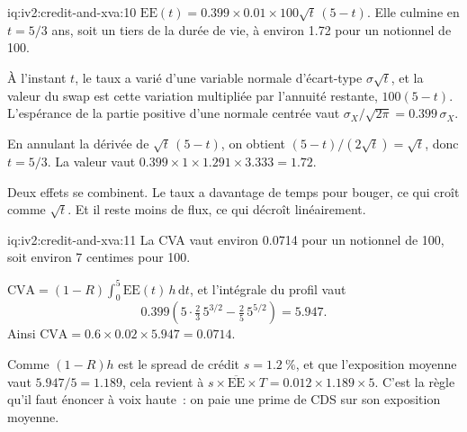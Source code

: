 \begin{solution}{iq:iv2:credit-and-xva:10}
$\mathrm{EE}(t) = 0.399 \times 0.01 \times 100 \sqrt{t}\,(5 - t)$. Elle culmine en $t = 5/3$ ans, soit un tiers de la durée de vie, à environ 1.72 pour un notionnel de 100.

À l'instant $t$, le taux a varié d'une variable normale d'écart-type $\sigma\sqrt{t}$, et la valeur du swap est cette variation multipliée par l'annuité restante, $100(5 - t)$. L'espérance de la partie positive d'une normale centrée vaut $\sigma_X/\sqrt{2\pi} = 0.399\,\sigma_X$.

En annulant la dérivée de $\sqrt{t}\,(5 - t)$, on obtient $(5 - t)/(2\sqrt{t}) = \sqrt{t}$, donc $t = 5/3$. La valeur vaut $0.399 \times 1 \times 1.291 \times 3.333 = 1.72$.

Deux effets se combinent. Le taux a davantage de temps pour bouger, ce qui croît comme $\sqrt{t}$. Et il reste moins de flux, ce qui décroît linéairement.

\end{solution}

\begin{solution}{iq:iv2:credit-and-xva:11}
La CVA vaut environ 0.0714 pour un notionnel de 100, soit environ 7 centimes pour 100.

$\mathrm{CVA} = (1 - R)\int_0^5 \mathrm{EE}(t)\, h\,\mathrm{d}t$, et l'intégrale du profil vaut
\[
0.399\left(5 \cdot \tfrac{2}{3}\, 5^{3/2} - \tfrac{2}{5}\, 5^{5/2}\right) = 5.947.
\]
Ainsi $\mathrm{CVA} = 0.6 \times 0.02 \times 5.947 = 0.0714$.

Comme $(1 - R)h$ est le spread de crédit $s = 1.2~\%$, et que l'exposition moyenne vaut $5.947/5 = 1.189$, cela revient à $s \times \overline{\mathrm{EE}} \times T = 0.012 \times 1.189 \times 5$. C'est la règle qu'il faut énoncer à voix haute~: on paie une prime de CDS sur son exposition moyenne.

\end{solution}

